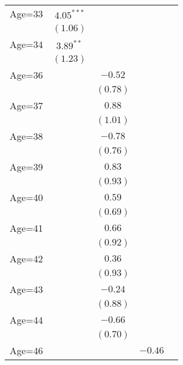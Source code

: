 \documentclass[fullpage]{paper}
\begin{document}
\begin{center}
\begin{longtable}{l c c c c }
Age=33      & $4.05^{***}$ &               &               &               \\
            & $(1.06)$     &               &               &               \\
Age=34      & $3.89^{**}$  &               &               &               \\
            & $(1.23)$     &               &               &               \\
Age=36      &              & $-0.52$       &               &               \\
            &              & $(0.78)$      &               &               \\
Age=37      &              & $0.88$        &               &               \\
            &              & $(1.01)$      &               &               \\
Age=38      &              & $-0.78$       &               &               \\
            &              & $(0.76)$      &               &               \\
Age=39      &              & $0.83$        &               &               \\
            &              & $(0.93)$      &               &               \\
Age=40      &              & $0.59$        &               &               \\
            &              & $(0.69)$      &               &               \\
Age=41      &              & $0.66$        &               &               \\
            &              & $(0.92)$      &               &               \\
Age=42      &              & $0.36$        &               &               \\
            &              & $(0.93)$      &               &               \\
Age=43      &              & $-0.24$       &               &               \\
            &              & $(0.88)$      &               &               \\
Age=44      &              & $-0.66$       &               &               \\
            &              & $(0.70)$      &               &               \\
Age=46      &              &               & $-0.46$       &               \\

\end{longtable}
\end{center}
\end{document}
